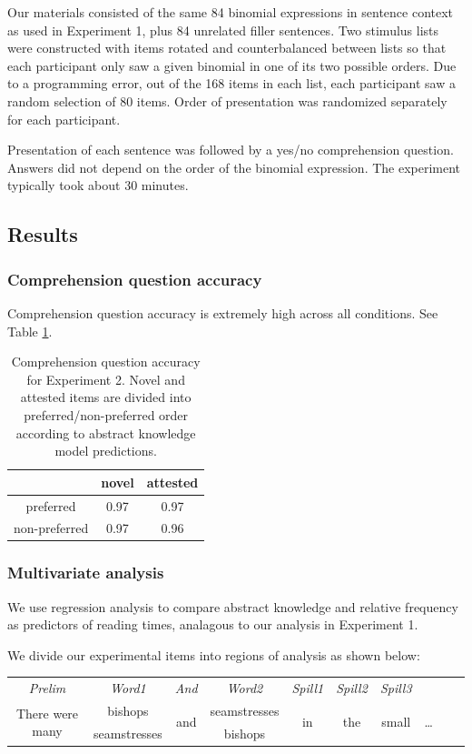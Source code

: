 \documentclass[authoryear]{elsarticle}
\begin{document}
Our materials consisted of the same 84 binomial expressions in sentence context as used in Experiment 1, plus 84 unrelated filler sentences. Two stimulus lists were constructed with items rotated and counterbalanced between lists so that each participant only saw a given binomial in one of its two possible orders. Due to a programming error, out of the 168 items in each list, each participant saw a random selection of 80 items. Order of presentation was randomized separately for each participant.

Presentation of each sentence was followed by a yes/no comprehension question. Answers did not depend on the order of the binomial expression. The experiment typically took about 30 minutes.


\subsection{Results}

\subsubsection{Comprehension question accuracy}
Comprehension question accuracy is extremely high across all conditions. See Table \ref{t:qcorrect}.


\begin{table}[t]
\centering
\begin{tabular}{ccc}\hline\hline
& novel & attested \\\hline
preferred & 0.97 & 0.97 \\
non-preferred & 0.97 & 0.96 \\\hline
\end{tabular}
\caption{Comprehension question accuracy for Experiment 2. Novel and attested items are divided into preferred/non-preferred order according to abstract knowledge model predictions.}\label{t:qcorrect}
\end{table}

\subsubsection{Multivariate analysis}\label{multivariate}
We use regression analysis to compare abstract knowledge and relative frequency as predictors of reading times, analagous to our analysis in Experiment 1.

We divide our experimental items into regions of analysis as shown below:

\noindent\begin{tabular}{c c c c c c c c c c}
 \emph{Prelim} & \emph{Word1} & \emph{And} & \emph{Word2} & \emph{Spill1} & \emph{Spill2} & \emph{Spill3 } & \\
\multirow{2}{*}{There were many} & bishops & \multirow{2}{*}{and} & seamstresses & \multirow{2}{*}{in} & \multirow{2}{*}{the} & \multirow{2}{*}{small} & \multirow{2}{*}{\ldots}\\
&seamstresses&&bishops
\end{tabular}
\end{document}

